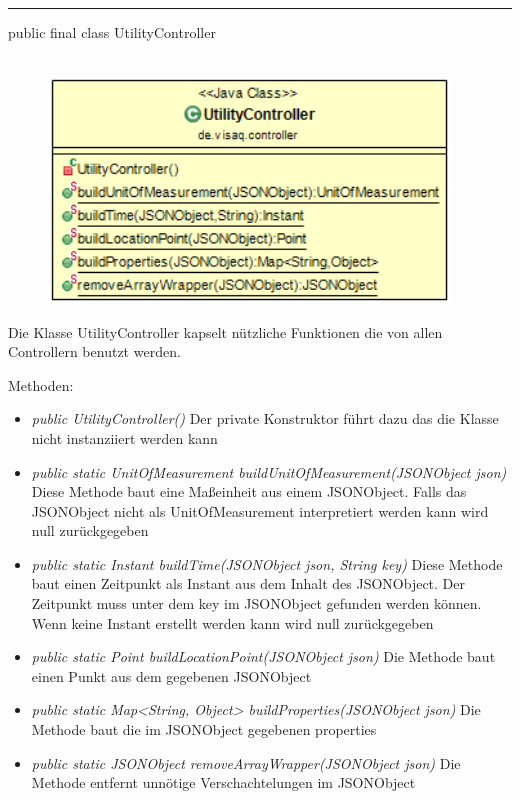 \rule{\textwidth}{0.4pt}
public final class UtilityController
\\\\
\begin{minipage}{0.5\textwidth}
    \begin{figure}[H]
        {\centering\includegraphics[width=0.95\textwidth]{media/backend/controller/classes/UtilityController.png}}
    \end{figure}
    \end{minipage} \hfill
\begin{minipage}{0.5\textwidth}
    Die Klasse UtilityController kapselt nützliche Funktionen die von allen Controllern benutzt werden.
\end{minipage}

Methoden:
\begin{itemize}
    \item \emph{public UtilityController()}
    Der private Konstruktor führt dazu das die Klasse nicht instanziiert werden kann
    \item \emph{public static UnitOfMeasurement buildUnitOfMeasurement(JSONObject json)}
    Diese Methode baut eine Maßeinheit aus einem JSONObject. Falls das JSONObject nicht als UnitOfMeasurement interpretiert werden kann wird null zurückgegeben
    \item \emph{public static Instant buildTime(JSONObject json, String key)}
    Diese Methode baut einen Zeitpunkt als Instant aus dem Inhalt des JSONObject. Der Zeitpunkt muss unter dem key im JSONObject gefunden werden können.
    Wenn keine Instant erstellt werden kann wird null zurückgegeben
    \item \emph{public static Point buildLocationPoint(JSONObject json)}
    Die Methode baut einen Punkt aus dem gegebenen JSONObject
    \item \emph{public static Map<String, Object> buildProperties(JSONObject json)}
    Die Methode baut die im JSONObject gegebenen properties
    \item \emph{public static JSONObject removeArrayWrapper(JSONObject json)}
    Die Methode entfernt unnötige Verschachtelungen im JSONObject
\end{itemize}
